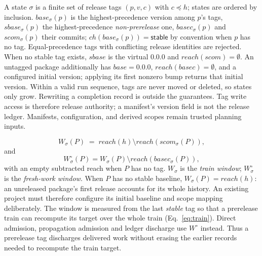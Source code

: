 \begin{definition}[state]
\label{def:state}
A state $\sigma$ is a finite set of release tags $(p, v, c)$ with
$c \preceq h$; states are ordered by inclusion. $\mathit{base}_\sigma(p)$
is the highest-precedence version among $p$'s tags,
$\mathit{sbase}_\sigma(p)$ the highest-precedence \emph{non-prerelease}
one, $\mathit{basec}_\sigma(p)$ and $\mathit{scom}_\sigma(p)$ their
commits; $\mathit{ch}(\mathit{base}_\sigma(p)) = \mathsf{stable}$ by
convention when $p$ has no tag. Equal-precedence tags with conflicting release identities are rejected.
When no stable tag exists, $\mathit{sbase}$ is the virtual 0.0.0 and
$\mathit{reach}(\mathit{scom})=\emptyset$. An untagged package additionally
has $\mathit{base}=0.0.0$, $\mathit{reach}(\mathit{basec})=\emptyset$, and a configured
initial version; applying its first nonzero bump returns that initial version.
Within a valid run sequence, tags are never moved or deleted, so states only
grow. Rewriting a completion record is outside the guarantees.
Tag write access is therefore release authority; a manifest's version field
is not the release ledger. Manifests, configuration, and derived scopes remain
trusted planning inputs.
\end{definition}

\begin{definition}
\label{def:window}
\begin{equation}
  W_\sigma(P) \;=\; \mathit{reach}(h) \setminus
                    \mathit{reach}(\mathit{scom}_\sigma(P)),
  \label{eq:window}
\end{equation}
and
\begin{equation}
  W^\circ_\sigma(P) = W_\sigma(P) \setminus
                       \mathit{reach}(\mathit{basec}_\sigma(P)),
  \label{eq:fresh}
\end{equation}
with an empty subtracted reach when $P$ has no tag.  $W_\sigma$ is the
\emph{train window}; $W^\circ_\sigma$ is the \emph{fresh-work window}.
When $P$ has no stable baseline, $W_\sigma(P) = \mathit{reach}(h)$:
an unreleased package's first release accounts for its whole
history. An existing project must therefore configure its initial baseline
and scope mapping deliberately. The window is measured from the last \emph{stable} tag
so that a prerelease train can recompute its target over the whole train
(Eq.~\ref{eq:train}). Direct admission, propagation admission and ledger
discharge use $W^\circ$ instead. Thus a prerelease tag discharges delivered
work without erasing the earlier records needed to recompute the train target.
\end{definition}

